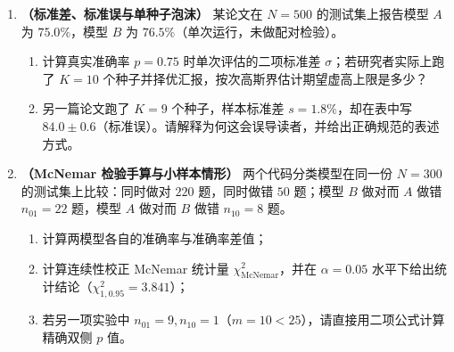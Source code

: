 \begin{enumerate}[label=\textbf{7.1.\arabic*}]
  \item \textbf{（标准差、标准误与单种子泡沫）} 某论文在 $N=500$ 的测试集上报告模型 $A$ 为 $75.0\%$，模型 $B$ 为 $76.5\%$（单次运行，未做配对检验）。
  \begin{enumerate}
    \item 计算真实准确率 $p=0.75$ 时单次评估的二项标准差 $\sigma$；若研究者实际上跑了 $K=10$ 个种子并择优汇报，按次高斯界估计期望虚高上限是多少？
    \item 另一篇论文跑了 $K=9$ 个种子，样本标准差 $s = 1.8\%$，却在表中写 $84.0 \pm 0.6$（标准误）。请解释为何这会误导读者，并给出正确规范的表述方式。
  \end{enumerate}

  \item \textbf{（McNemar 检验手算与小样本情形）} 两个代码分类模型在同一份 $N=300$ 的测试集上比较：同时做对 $220$ 题，同时做错 $50$ 题；模型 $B$ 做对而 $A$ 做错 $n_{01}=22$ 题，模型 $A$ 做对而 $B$ 做错 $n_{10}=8$ 题。
  \begin{enumerate}
    \item 计算两模型各自的准确率与准确率差值；
    \item 计算连续性校正 McNemar 统计量 $\chi^2_{\mathrm{McNemar}}$，并在 $\alpha=0.05$ 水平下给出统计结论（$\chi^2_{1,0.95}=3.841$）；
    \item 若另一项实验中 $n_{01}=9, n_{10}=1$（$m=10 < 25$），请直接用二项公式计算精确双侧 $p$ 值。
  \end{enumerate}
\end{enumerate}


